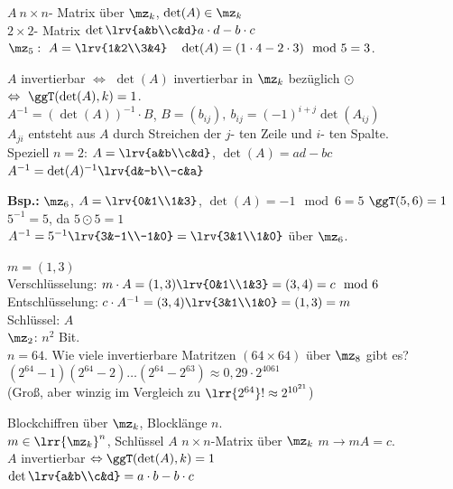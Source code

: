 		$A\ n\times n$- Matrix über $\mz_k$, $\det(A)\in\mz_k$\\
		$2\times 2$- Matrix $\det\lrv{a&b\\c&d}a\cdot d-b\cdot c$\\
		$\mz_5:\ A=\lrv{1&2\\3&4}\quad\det(A)=(1\cdot 4-2\cdot 3)\mod 5=3$.
		
		$A$ invertierbar $\Leftrightarrow$ $\det(A)$ invertierbar in $\mz_k$ bezüglich $\odot$ $\Leftrightarrow\ \ggT(\det(A),k)=1$.\\
		$A^{-1}=(\det(A))^{-1}\cdot B$, $B=(b_{ij}),\ b_{ij}=(-1)^{i+j}\det(A_{ij})$\\
		$A_{ji}$ entsteht aus $A$ durch Streichen der $j$- ten Zeile und $i$- ten Spalte.\\
		Speziell $n=2$: $A=\lrv{a&b\\c&d}$, $\det(A)=ad-bc$\\
		$A^{-1}=\det(A)^{-1}\lrv{d&-b\\-c&a}$
		
		\textbf{Bsp.:} $\mz_6$, $A=\lrv{0&1\\1&3}$, $\det(A)=-1\mod 6=5$ $\ggT(5,6)=1$\\
		$5^{-1}=5$, da $5\odot 5=1$\\
		$A^{-1}=5^{-1}\lrv{3&-1\\-1&0}=\lrv{3&1\\1&0}$ über $\mz_6$.
		
		$m=(1,3)$\\
		Verschlüsselung: $m\cdot A=(1,3)\lrv{0&1\\1&3}=(3,4)=c\mod 6$\\
		Entschlüsselung: $c\cdot A^{-1}=(3,4)\lrv{3&1\\1&0}=(1, 3)=m$\\
		Schlüssel: $A$\\
		$\mz_2$: $n^2$ Bit.\\
		$n=64$. Wie viele invertierbare Matritzen $(64\times 64)$ über $\mz_8$ gibt es?\\
		$(2^{64}-1)(2^{64}-2)\dots(2^{64}-2^{63})\approx 0,29\cdot 2^{4061}$\\
		(Groß, aber winzig im Vergleich zu $\lrr{2^{64}}!\approx 2^{10^{21}}$)
		
		Blockchiffren über $\mz_k$, Blocklänge $n$.\\
		$m\in\lrr{\mz_k}^n$, Schlüssel $A$ $n\times n$-Matrix über $\mz_k$ $m\rightarrow mA=c$.\\
		$A$ invertierbar $\Leftrightarrow \ggT(\det(A), k)=1$\\
		$\det\lrv{a&b\\c&d}=a\cdot b-b\cdot c$
